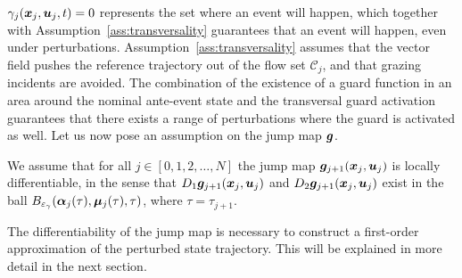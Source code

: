 \documentclass[../DC2017114Bouma.tex]{subfiles}
\begin{document}

$\gamma_j({\boldsymbol{x}}_j,{\boldsymbol{u}}_j,t) = 0$ represents the set where an event will happen, which together with Assumption~\ref{ass:transversality} guarantees that an event will happen, even under perturbations. Assumption~\ref{ass:transversality} assumes that the vector field pushes the reference trajectory out of the flow set $\mathcal{C}_j$, and that grazing incidents are avoided. The combination of the existence of a guard function in an area around the nominal ante-event state and the transversal guard activation guarantees that there exists a range of perturbations where the guard is activated as well. Let us now pose an assumption on the jump map ${\boldsymbol{g}}$.

\begin{myass}\label{ass:jump}
We assume that for all $j \in [0,1,2,\dots,N]$ the jump map ${\boldsymbol{g}}_{j+1}({\boldsymbol{x}}_j,{\boldsymbol{u}}_j)$ is locally differentiable, in the sense that $D_1{\boldsymbol{g}}_{j+1}({\boldsymbol{x}}_j,{\boldsymbol{u}}_j)$ and $D_2{\boldsymbol{g}}_{j+1}({\boldsymbol{x}}_j,{\boldsymbol{u}}_j)$ exist in the ball $B_{\varepsilon_{\gamma}}(\boldsymbol{\alpha}_j(\tau),\boldsymbol{\mu}_j(\tau),\tau)$, where $\tau = \tau_{j+1}$.
\end{myass}

The differentiability of the jump map is necessary to construct a first-order approximation of the perturbed state trajectory. This will be explained in more detail in the next section.
\end{document}
